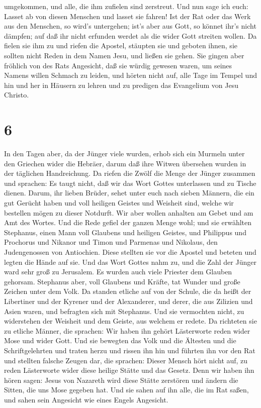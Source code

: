 umgekommen, und alle, die ihm zufielen sind zerstreut.  Und
nun sage ich euch: Lasset ab von diesen Menschen und lasset sie fahren!
Ist der Rat oder das Werk aus den Menschen, so wird's untergehen;
 ist's aber aus Gott, so könnet ihr's nicht dämpfen; auf
daß ihr nicht erfunden werdet als die wider Gott streiten wollen.
 Da fielen sie ihm zu und riefen die Apostel, stäupten sie
und geboten ihnen, sie sollten nicht Reden in dem Namen Jesu, und ließen
sie gehen.  Sie gingen aber fröhlich von des Rats
Angesicht, daß sie würdig gewesen waren, um seines Namens willen Schmach
zu leiden,  und hörten nicht auf, alle Tage im Tempel und
hin und her in Häusern zu lehren und zu predigen das Evangelium von Jesu
Christo.

\hypertarget{section-5}{%
\section{6}\label{section-5}}

 In den Tagen aber, da der Jünger viele wurden, erhob sich
ein Murmeln unter den Griechen wider die Hebräer, darum daß ihre Witwen
übersehen wurden in der täglichen Handreichung.  Da riefen
die Zwölf die Menge der Jünger zusammen und sprachen: Es taugt nicht,
daß wir das Wort Gottes unterlassen und zu Tische dienen. 
Darum, ihr lieben Brüder, sehet unter euch nach sieben Männern, die ein
gut Gerücht haben und voll heiligen Geistes und Weisheit sind, welche
wir bestellen mögen zu dieser Notdurft.  Wir aber wollen
anhalten am Gebet und am Amt des Wortes.  Und die Rede
gefiel der ganzen Menge wohl; und sie erwählten Stephanus, einen Mann
voll Glaubens und heiligen Geistes, und Philippus und Prochorus und
Nikanor und Timon und Parmenas und Nikolaus, den Judengenossen von
Antiochien.  Diese stellten sie vor die Apostel und beteten
und legten die Hände auf sie.  Und das Wort Gottes nahm zu,
und die Zahl der Jünger ward sehr groß zu Jerusalem. Es wurden auch
viele Priester dem Glauben gehorsam.  Stephanus aber, voll
Glaubens und Kräfte, tat Wunder und große Zeichen unter dem Volk.
 Da standen etliche auf von der Schule, die da heißt der
Libertiner und der Kyrener und der Alexanderer, und derer, die aus
Zilizien und Asien waren, und befragten sich mit Stephanus.
 Und sie vermochten nicht, zu widerstehen der Weisheit und
dem Geiste, aus welchem er redete.  Da richteten sie zu
etliche Männer, die sprachen: Wir haben ihn gehört Lästerworte reden
wider Mose und wider Gott.  Und sie bewegten das Volk und
die Ältesten und die Schriftgelehrten und traten herzu und rissen ihn
hin und führten ihn vor den Rat  und stellten falsche
Zeugen dar, die sprachen: Dieser Mensch hört nicht auf, zu reden
Lästerworte wider diese heilige Stätte und das Gesetz. 
Denn wir haben ihn hören sagen: Jesus von Nazareth wird diese Stätte
zerstören und ändern die Sitten, die uns Mose gegeben hat. 
Und sie sahen auf ihn alle, die im Rat saßen, und sahen sein Angesicht
wie eines Engels Angesicht.

